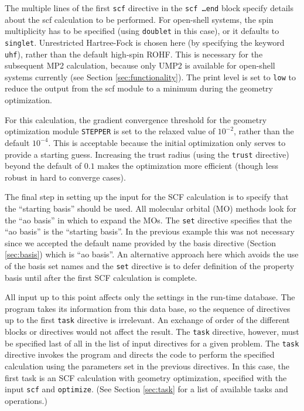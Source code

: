 The multiple lines of the first {\tt scf} directive in the {\tt scf
  \ldots end} block specify details about the scf calculation to be
performed.  For open-shell systems, the spin multiplicity has to be
specified (using {\tt doublet} in this case), or it defaults to {\tt
  singlet}.  Unrestricted Hartree-Fock is chosen here (by specifying
the keyword {\tt uhf}), rather than the default high-spin ROHF.  This
is necessary for the subsequent MP2 calculation, because only UMP2 is
available for open-shell systems currently (see Section
\ref{sec:functionality}).  The print level is set to {\tt low} to
reduce the output from the scf module to a minimum during the geometry
optimization.

For this calculation, the gradient convergence threshold for the
geometry optimization module {\tt STEPPER} is set to the
relaxed value of $10^{-2}$, rather than the default $10^{-4}$.  This is
acceptable because the initial optimization only serves to provide a
starting guess.  Increasing the trust radius (using the \verb+trust+
directive) beyond the default of $0.1$ makes the optimization more
efficient (though less robust in hard to converge cases).

The final step in setting up the input for the SCF calculation is to
specify that the ``starting basis'' should be used.  All molecular
orbital (MO) methods look for the ``ao basis'' in which to expand the
MOs.  The \verb+set+ directive specifies that the ``ao basis'' is the
``starting basis''.  In the previous example this was not necessary
since we accepted the default name provided by the basis directive
(Section \ref{sec:basis}) which is ``ao basis''.  An alternative
approach here which avoids the use of the basis set names and the
\verb+set+ directive is to defer definition of the property basis
until after the first SCF calculation is complete. 

All input up to this point affects only the settings in the run-time
database.  The program takes its information from this data base, so
the sequence of directives up to the first \verb+task+ directive is
irrelevant.  An exchange of order of the different blocks or
directives would not affect the result.  The {\tt task} directive,
however, must be specified last of all in the list of input directives
for a given problem.  The {\tt task} directive invokes the program and
directs the code to perform the specified calculation using the
parameters set in the previous directives. In this case, the first
task is an SCF calculation with geometry optimization, specified with
the input {\tt scf} and {\tt optimize}.  (See Section \ref{sec:task}
for a list of available tasks and operations.)

